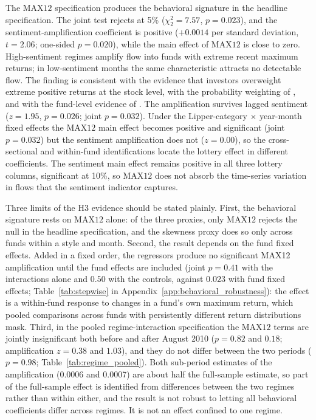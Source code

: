 \documentclass[12pt, oneside]{report}
\begin{document}
The $\text{MAX12}$ specification produces the behavioral signature in the
headline specification. The joint test rejects at 5\%
($\chi^2_2 = 7.57$, $p = 0.023$), and the sentiment-amplification
coefficient is positive ($+0.0014$ per standard deviation, $t = 2.06$;
one-sided $p = 0.020$), while the main effect of $\text{MAX12}$ is close
to zero. High-sentiment regimes amplify flow into funds with extreme
recent maximum returns; in low-sentiment months the same characteristic
attracts no detectable flow. The finding is consistent with the
\textcite{BaliCakiciWhitelaw2011} evidence that investors overweight
extreme positive returns at the stock level, with the probability
weighting of \textcite{BarberisHuang2008}, and with the fund-level
evidence of \textcite{ChengEtal2025}. The amplification survives lagged
sentiment ($z = 1.95$, $p = 0.026$; joint $p = 0.032$). Under the
Lipper-category $\times$ year-month fixed effects the $\text{MAX12}$ main
effect becomes positive and significant (joint $p = 0.032$) but the
sentiment amplification does not ($z = 0.00$), so the cross-sectional
and within-fund identifications locate the lottery effect in different
coefficients. The sentiment main effect remains positive in all three
lottery columns, significant at 10\%, so $\text{MAX12}$ does not
absorb the time-series variation in flows that the sentiment indicator
captures.

Three limits of the H3 evidence should be stated plainly. First, the
behavioral signature rests on $\text{MAX12}$ alone: of the three proxies,
only $\text{MAX12}$ rejects the null in the headline specification, and
the skewness proxy does so only across funds within a style and month.
Second, the result depends on the fund fixed effects. Added in a fixed
order, the regressors produce no significant MAX12 amplification until
the fund effects are included (joint $p = 0.41$ with the interactions
alone and $0.50$ with the controls, against $0.023$ with fund fixed
effects; Table~\ref{tab:stepwise} in
Appendix~\ref{app:behavioral_robustness}): the effect is a within-fund
response to changes in a fund's own maximum return, which pooled
comparisons across funds with persistently different return
distributions mask. Third, in the pooled regime-interaction
specification the $\text{MAX12}$ terms are jointly insignificant both
before and after August 2010 ($p = 0.82$ and $0.18$; amplification
$z = 0.38$ and $1.03$), and they do not differ between the two periods
($p = 0.98$; Table~\ref{tab:regime_pooled}). Both sub-period estimates of
the amplification (0.0006 and 0.0007) are about half the full-sample
estimate, so part of the full-sample effect is identified from
differences between the two regimes rather than within either, and the
result is not robust to letting all behavioral coefficients differ
across regimes. It is not an effect
confined to one regime.
\end{document}
